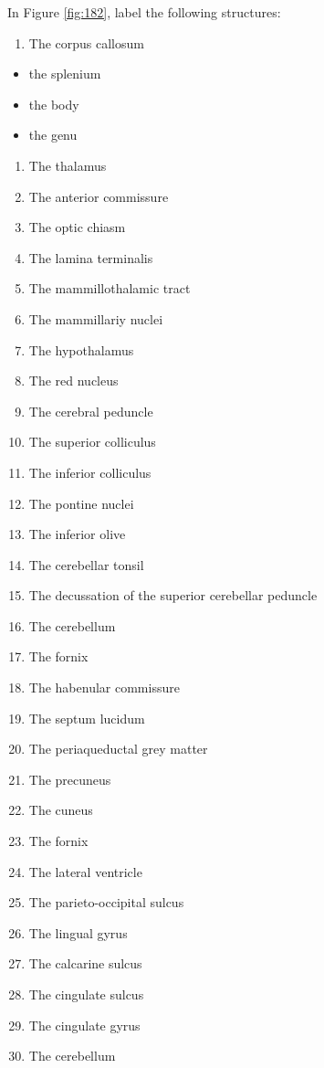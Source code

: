 \documentclass[]{book}
\providecommand{\tightlist}{%
  \setlength{\itemsep}{0pt}\setlength{\parskip}{0pt}}
\begin{document}
In Figure \ref{fig:182}, label the following structures:

\begin{enumerate}
\def\labelenumi{\arabic{enumi}.}
\tightlist
\item
  The corpus callosum
\end{enumerate}

\begin{itemize}
\tightlist
\item
  the splenium
\item
  the body
\item
  the genu
\end{itemize}

\begin{enumerate}
\def\labelenumi{\arabic{enumi}.}
\tightlist
\item
  The thalamus
\item
  The anterior commissure
\item
  The optic chiasm
\item
  The lamina terminalis
\item
  The mammillothalamic tract
\item
  The mammillariy nuclei
\item
  The hypothalamus
\item
  The red nucleus
\item
  The cerebral peduncle
\item
  The superior colliculus
\item
  The inferior colliculus
\item
  The pontine nuclei
\item
  The inferior olive
\item
  The cerebellar tonsil
\item
  The decussation of the superior cerebellar peduncle
\item
  The cerebellum
\item
  The fornix
\item
  The habenular commissure
\item
  The septum lucidum
\item
  The periaqueductal grey matter
\item
  The precuneus
\item
  The cuneus
\item
  The fornix
\item
  The lateral ventricle
\item
  The parieto-occipital sulcus
\item
  The lingual gyrus
\item
  The calcarine sulcus
\item
  The cingulate sulcus
\item
  The cingulate gyrus
\item
  The cerebellum
\end{enumerate}
\end{document}
